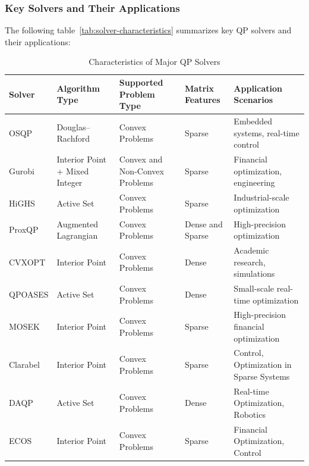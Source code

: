 \documentclass{article}
\begin{document}
\subsubsection{Key Solvers and Their Applications}
The following table~\ref{tab:solver-characteristics} summarizes key QP solvers and their applications:
\begin{table}[ht]
\centering
\caption{Characteristics of Major QP Solvers}
\begin{adjustbox}{max width=\textwidth}
\begin{tabular}{|l|l|l|l|l|}
\hline
\textbf{Solver} & \textbf{Algorithm Type}      & \textbf{Supported Problem Type} & \textbf{Matrix Features} & \textbf{Application Scenarios}     \\ \hline
OSQP            & Douglas–Rachford            & Convex Problems                 & Sparse                   & Embedded systems, real-time control \\ \hline
Gurobi          & Interior Point + Mixed Integer & Convex and Non-Convex Problems  & Sparse                   & Financial optimization, engineering \\ \hline
HiGHS           & Active Set                  & Convex Problems                 & Sparse                   & Industrial-scale optimization       \\ \hline
ProxQP          & Augmented Lagrangian        & Convex Problems                 & Dense and Sparse         & High-precision optimization         \\ \hline
CVXOPT          & Interior Point              & Convex Problems                 & Dense                    & Academic research, simulations      \\ \hline
QPOASES         & Active Set                  & Convex Problems                 & Dense                    & Small-scale real-time optimization  \\ \hline
MOSEK           & Interior Point              & Convex Problems                 & Sparse                   & High-precision financial optimization \\ \hline
Clarabel        & Interior Point              & Convex Problems                 & Sparse                   & Control, Optimization in Sparse Systems \\ \hline
DAQP            & Active Set                  & Convex Problems                 & Dense                    & Real-time Optimization, Robotics     \\ \hline
ECOS            & Interior Point              & Convex Problems                 & Sparse                   & Financial Optimization, Control      \\ \hline

\end{tabular}
\end{adjustbox}
\end{table}
\end{document}
